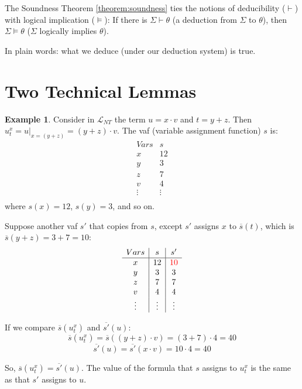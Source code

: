\documentclass[11pt,letterpaper]{book}
\theoremstyle{definition}
\newtheorem{example}{Example}[section]
\begin{document}
The Soundness Theorem \ref{theorem:soundness} ties the notions of
deducibility ($\vdash$) with logical implication ($\models$): If there
is $\Sigma \vdash \theta$ (a deduction from $\Sigma$ to $\theta$), then
$\Sigma \models \theta$ ($\Sigma$ logically implies $\theta$).

In plain words: what we deduce (under our deduction system) is true.


\section{Two Technical Lemmas}

\begin{example}
Consider in $\mathcal{L}_{NT}$ the term $u = x \cdot v$ and $t = y + z$.
Then $u_t ^x = u |_{ x= (y+z) } = (y+z) \cdot v$. The vaf (variable
assignment function)
$s$ is:
\begin{equation}
\begin{array}{c|c}
Vars & s \\
\hline
x & 12 \\
y & 3 \\
z & 7 \\
v & 4 \\
\vdots & \vdots \\
\end{array} \nonumber
\end{equation}
where $s(x)=12$, $s(y)=3$, and so on.

Suppose another vaf $s'$ that copies from $s$, except $s'$ assigns $x$
to $\overline{s}(t)$, which is $\overline{s}(y+z) = 3 + 7 = 10$:
\begin{equation}
\begin{array}{c|c|c}
Vars & s & s' \\
\hline
x & 12 & {\color{red}10} \\
y & 3  & 3  \\
z & 7  & 7  \\
v & 4  & 4  \\
\vdots & \vdots & \vdots \\
\end{array} \nonumber
\end{equation}

If we compare $\overline{s}(u_t ^x)$ and $\overline{s'} (u)$:
$$\overline{s}(u_t ^x) = \overline{s} ( (y+z) \cdot v ) = (3+7) \cdot 4
= 40  $$
$$ \overline{s'} (u) = \overline{s'} ( x \cdot v) = 10 \cdot 4 = 40 $$

So, $\overline{s}(u_t ^x) = \overline{s'} (u)$. The value of the formula
that $s$ assigns to $u_t ^x$ is the same as that $s'$ assigns to $u$.
\end{example}
\end{document}

